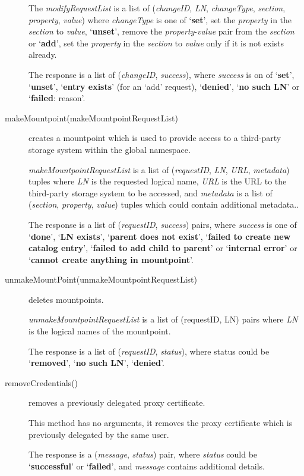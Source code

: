 \documentclass{book}
\begin{document}
\begin{description}
    The \emph{modifyRequestList} is a list of (\emph{changeID}, \emph{LN}, \emph{changeType}, \emph{section}, \emph{property}, \emph{value}) where \emph{changeType} is one of `\textbf{set}', set the \emph{property} in the \emph{section} to \emph{value}, `\textbf{unset}', remove the \emph{property}-\emph{value} pair from the \emph{section} or `\textbf{add}', set the \emph{property} in the \emph{section} to \emph{value} only if it is not exists already. 

    The response is a list of (\emph{changeID}, \emph{success}), where \emph{success} is on of `\textbf{set}', `\textbf{unset}', `\textbf{entry exists}' (for an `add' request), `\textbf{denied}', `\textbf{no such LN}' or `\textbf{failed}: reason'.
   
    \item[makeMountpoint(makeMountpointRequestList)] creates a mountpoint which is used to provide access to a third-party storage system within the global namespace.

    \emph{makeMountpointRequestList} is a list of (\emph{requestID}, \emph{LN}, \emph{URL}, \emph{metadata}) tuples where \emph{LN} is the requested logical name, \emph{URL} is the URL to the third-party storage system to be accessed, and \emph{metadata} is a list of (\emph{section}, \emph{property}, \emph{value}) tuples which could contain additional metadata..
    
    The response is a list of (\emph{requestID}, \emph{success}) pairs, where \emph{success} is one of `\textbf{done}', `\textbf{LN exists}', `\textbf{parent does not exist}', `\textbf{failed to create new catalog entry}', `\textbf{failed to add child to parent}' or `\textbf{internal error}' or `\textbf{cannot create anything in mountpoint}'.

    \item[unmakeMountPoint(unmakeMountpointRequestList)] deletes mountpoints.

    \emph{unmakeMountpointRequestList} is a list of (requestID, LN) pairs where \emph{LN} is the logical names of the mountpoint.
    
    The response is a list of (\emph{requestID}, \emph{status}), where status could be `\textbf{removed}', `\textbf{no such LN}', `\textbf{denied}'.

    \item[removeCredentials()] removes a previously delegated proxy certificate.
    
    This method has no arguments, it removes the proxy certificate which is previously delegated by the same user.
    
    The response is a (\emph{message}, \emph{status}) pair, where \emph{status} could be `\textbf{successful}' or `\textbf{failed}', and \emph{message} contains additional details.
\end{description}
\end{document}
